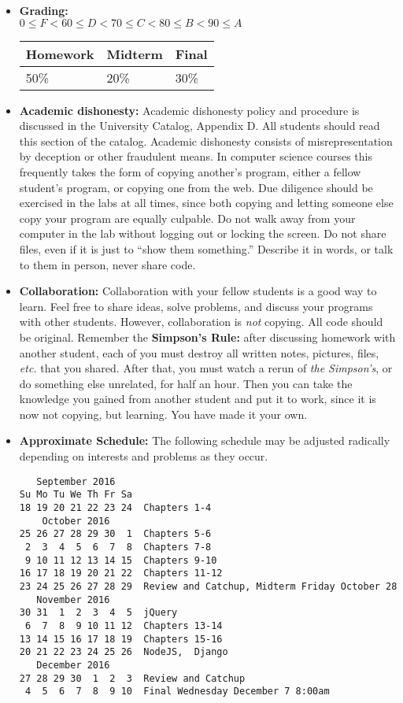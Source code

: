 \documentclass{article}
\begin{document}
\begin{itemize}
\item {\bf Grading:} \\
$0\leq F < 60 \leq D < 70 \leq C < 80 \leq B < 90 \leq A$\hfill
\begin{tabular}{|l|l|l|}\hline
Homework  & Midterm & Final\\\hline
50\% & 20\% & 30\%\\\hline
\end{tabular}

\item {\bf Academic dishonesty:} Academic dishonesty policy and
  procedure is discussed in the University Catalog, Appendix D.  All
  students should read this section of the catalog.  Academic
  dishonesty consists of misrepresentation by deception or other
  fraudulent means.  In computer science courses this frequently takes
  the form of copying another's program, either a fellow student's
  program, or copying one from the web.  Due diligence should be
  exercised in the labs at all times, since both copying and letting
  someone else copy your program are equally culpable.  Do not walk
  away from your computer in the lab without logging out or locking
  the screen.  Do not share files, even if it is just to ``show them
  something.''  Describe it in words, or talk to them in person, never
  share code.

\item {\bf Collaboration:} Collaboration with your fellow students is
  a good way to learn.  Feel free to share ideas, solve problems, and
  discuss your programs with other students.  However, collaboration
  is {\em not} copying.  All code should be original.  Remember the
  {\bf Simpson's Rule:} after discussing homework with another
  student, each of you must destroy all written notes, pictures,
  files, {\em etc.} that you shared.  After that, you must watch a
  rerun of {\em the Simpson's}, or do something else unrelated, for
  half an hour.  Then you can take the knowledge you gained from
  another student and put it to work, since it is now not copying, but
  learning.  You have made it your own.

\item
{\bf Approximate Schedule:} The following schedule may be adjusted
radically depending on interests and problems as they occur.  


\begin{verbatim}
   September 2016     
Su Mo Tu We Th Fr Sa  
18 19 20 21 22 23 24  Chapters 1-4
    October 2016      
25 26 27 28 29 30  1  Chapters 5-6
 2  3  4  5  6  7  8  Chapters 7-8
 9 10 11 12 13 14 15  Chapters 9-10
16 17 18 19 20 21 22  Chapters 11-12
23 24 25 26 27 28 29  Review and Catchup, Midterm Friday October 28
   November 2016      
30 31  1  2  3  4  5  jQuery
 6  7  8  9 10 11 12  Chapters 13-14
13 14 15 16 17 18 19  Chapters 15-16
20 21 22 23 24 25 26  NodeJS,  Django
   December 2016      
27 28 29 30  1  2  3  Review and Catchup
 4  5  6  7  8  9 10  Final Wednesday December 7 8:00am
\end{verbatim}
\end{itemize}
\end{document}
